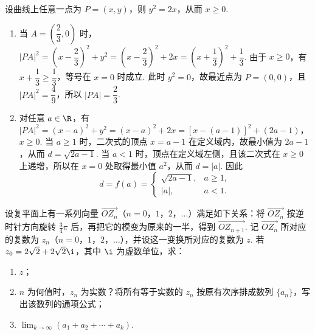 \begin{solution}
设曲线上任意一点为 \(P=(x,y)\)，则 \(y^2=2x\)，从而 \(x\geqslant0\).

\begin{enumerate}
\item 当 \(A=\left(\dfrac23,0\right)\) 时，
\(|PA|^2=\left(x-\dfrac23\right)^2+y^2=\left(x-\dfrac23\right)^2+2x=\left(x+\dfrac13\right)^2+\dfrac13\).
由于 \(x\geqslant0\)，有 \(x+\dfrac13\geqslant\dfrac13\)，等号在 \(x=0\) 时成立. 此时 \(y^2=0\)，故最近点为 \(P=(0,0)\)，且 \(|PA|^2=\dfrac49\)，所以 \(|PA|=\dfrac23\).
\item 对任意 \(a\in\R\)，有
\(|PA|^2=(x-a)^2+y^2=(x-a)^2+2x=\left[x-(a-1)\right]^2+(2a-1)\)，\(x\geqslant0\).
当 \(a\geqslant1\) 时，二次式的顶点 \(x=a-1\) 在定义域内，故最小值为 \(2a-1\)，从而 \(d=\sqrt{2a-1}\). 当 \(a<1\) 时，顶点在定义域左侧，且该二次式在 \(x\geqslant0\) 上递增，所以在 \(x=0\) 处取得最小值 \(a^2\)，从而 \(d=|a|\). 因此
\[
d=f(a)=
\begin{cases}
\sqrt{2a-1},&a\geqslant1,\\
|a|,&a<1.
\end{cases}
\]
\end{enumerate}
\end{solution}

\begin{problem}
设复平面上有一系列向量 \(\overrightarrow{OZ_n}\)（\(n=0\)，\(1\)，\(2\)，\(\dots\)）满足如下关系：将 \(\overrightarrow{OZ_n}\) 按逆时针方向旋转 \(\frac{3}{4}\pi\) 后，再把它的模变为原来的一半，得到 \(\overrightarrow{OZ_{n+1}}\). 记 \(\overrightarrow{OZ_n}\) 所对应的复数为 \(z_n\)（\(n=0\)，\(1\)，\(2\)，\(\dots\)），并设这一变换所对应的复数为 \(z\). 若 \(z_0=2\sqrt{2}+2\sqrt{2}\i\)，其中 \(\i\) 为虚数单位，求：

\begin{enumerate}
\item \(z\)；
\item \(n\) 为何值时，\(z_n\) 为实数？将所有等于实数的 \(z_n\) 按原有次序排成数列 \(\{a_n\}\)，写出该数列的通项公式；
\item \(\displaystyle\lim_{k\to\infty}\left(a_1+a_2+\cdots+a_k\right)\).
\end{enumerate}
\end{problem}


